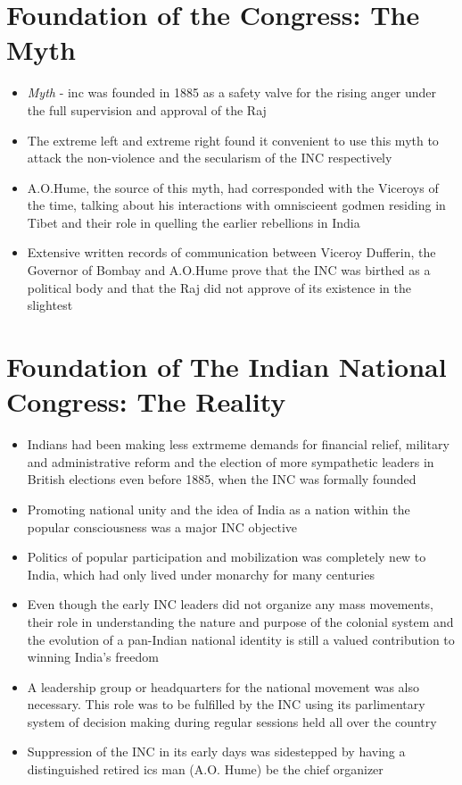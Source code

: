 \section{Foundation of the Congress: The Myth}
\begin{itemize}
    \item \textit{Myth} - \acrshort{inc} was founded in 1885 as a safety valve for the  rising anger under the full supervision and approval of the Raj
    \item The extreme left and extreme right found it convenient to use this myth to attack the non-violence and the secularism of the INC respectively
    \item A.O.Hume, the source of this myth, had corresponded with the Viceroys of the time, talking about his interactions with omniscieent godmen residing in Tibet and their role in quelling the earlier rebellions in India
    \item Extensive written records of communication between Viceroy Dufferin, the Governor of Bombay and A.O.Hume prove that the INC was birthed as a political body and that the Raj did not approve of its existence in the slightest
\end{itemize}

\section{Foundation of The Indian National Congress: The Reality}
\begin{itemize}
    \item Indians had been making less extrmeme demands for financial relief, military and administrative reform and the election of more sympathetic leaders in British elections even before 1885, when the INC was formally founded
    \item Promoting national unity and the idea of India as a nation within the popular consciousness was a major INC objective
    \item Politics of popular participation and mobilization was completely new to India, which had only lived under monarchy for many centuries
    \item Even though the early INC leaders did not organize any mass movements, their role in understanding the nature and purpose of the colonial system and the evolution of a pan-Indian national identity is still a valued contribution to winning India's freedom
    \item A leadership group  or headquarters for the national movement was also necessary. This role was to be fulfilled by the INC using its parlimentary system of decision making during regular sessions held all over the country
    \item Suppression of the INC in its early days was sidestepped by having a distinguished retired \acrshort{ics} man (A.O. Hume) be the chief organizer
\end{itemize}

